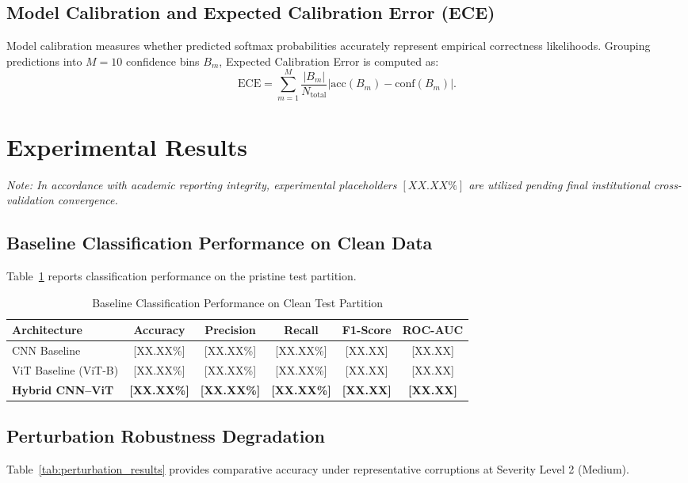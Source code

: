 \documentclass[conference]{IEEEtran}
\begin{document}
\subsection{Model Calibration and Expected Calibration Error (ECE)}
Model calibration measures whether predicted softmax probabilities accurately represent empirical correctness likelihoods. Grouping predictions into $M = 10$ confidence bins $B_m$, Expected Calibration Error is computed as:
\begin{equation}
\text{ECE} = \sum_{m=1}^M \frac{|B_m|}{N_{\text{total}}} \big| \text{acc}(B_m) - \text{conf}(B_m) \big|.
\end{equation}

\section{Experimental Results}
\label{sec:results}

\textit{Note: In accordance with academic reporting integrity, experimental placeholders $[XX.XX\%]$ are utilized pending final institutional cross-validation convergence.}

\subsection{Baseline Classification Performance on Clean Data}
Table~\ref{tab:clean_results} reports classification performance on the pristine test partition.

\begin{table}[htbp]
\caption{Baseline Classification Performance on Clean Test Partition}
\label{tab:clean_results}
\centering
\begin{tabular}{lccccc}
\toprule
\textbf{Architecture} & \textbf{Accuracy} & \textbf{Precision} & \textbf{Recall} & \textbf{F1-Score} & \textbf{ROC-AUC} \\
\midrule
CNN Baseline          & [XX.XX\%] & [XX.XX\%] & [XX.XX\%] & [XX.XX] & [XX.XX] \\
ViT Baseline (ViT-B)  & [XX.XX\%] & [XX.XX\%] & [XX.XX\%] & [XX.XX] & [XX.XX] \\
\textbf{Hybrid CNN--ViT} & \textbf{[XX.XX\%]} & \textbf{[XX.XX\%]} & \textbf{[XX.XX\%]} & \textbf{[XX.XX]} & \textbf{[XX.XX]} \\
\bottomrule
\end{tabular}
\end{table}

\subsection{Perturbation Robustness Degradation}
Table~\ref{tab:perturbation_results} provides comparative accuracy under representative corruptions at Severity Level 2 (Medium).
\end{document}
